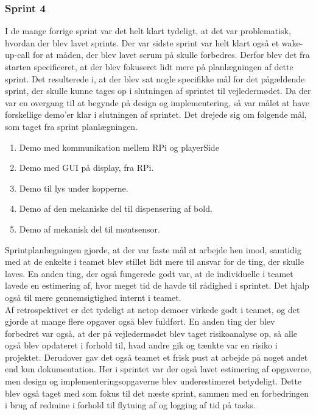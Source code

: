 \documentclass[a4paper,12pt,fleqn,oneside]{article}
\begin{document}
\subsubsection{Sprint 4}
I de mange forrige sprint var det helt klart tydeligt, at det var problematisk, hvordan der blev lavet sprints. Der var sidste sprint var helt klart også et wake-up-call for at måden, der blev lavet scrum på skulle forbedres. Derfor blev det fra starten specificeret, at der blev fokuseret lidt mere på planlægningen af dette sprint. Det resulterede i, at der blev sat nogle specifikke mål for det pågældende sprint, der skulle kunne tages op i slutningen af sprintet til vejledermødet. Da der var en overgang til at begynde på design og implementering, så var målet at have forskellige demo'er klar i slutningen af sprintet. Det drejede sig om følgende mål, som taget fra sprint planlægningen.
\begin{enumerate}
    \item Demo med kommunikation mellem RPi og playerSide
    \item Demo med GUI på display, fra RPi.
    \item Demo til lys under kopperne.
    \item Demo af den mekaniske del til dispensering af bold.
    \item Demo af mekanisk del til møntsensor.
\end{enumerate}
Sprintplanlægningen gjorde, at der var faste mål at arbejde hen imod, samtidig med at de enkelte i teamet blev stillet lidt mere til ansvar for de ting, der skulle laves. En anden ting, der også fungerede godt var, at de individuelle i teamet lavede en estimering af, hvor meget tid de havde til rådighed i sprintet. Det hjalp også til mere gennemsigtighed internt i teamet.
\\Af retrospektivet er det tydeligt at netop demoer virkede godt i teamet, og det gjorde at mange flere opgaver også blev fuldført. En anden ting der blev forbedret var også, at der på vejledermødet blev taget risikoanalyse op, så alle også blev opdateret i forhold til, hvad andre gik og tænkte var en risiko i projektet. Derudover gav det også teamet et frisk pust at arbejde på noget andet end kun dokumentation. Her i sprintet var der også lavet estimering af opgaverne, men design og implementeringsopgaverne blev underestimeret betydeligt. Dette blev også taget med som fokus til det næste sprint, sammen med en forbedringen i brug af redmine i forhold til flytning af og logging af tid på tasks.
\end{document}
